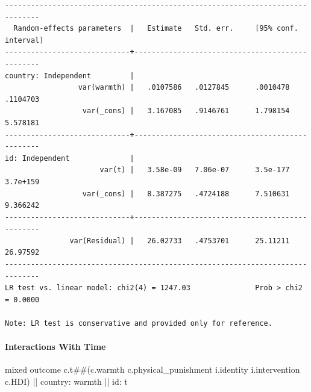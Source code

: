 \documentclass[
  letterpaper,
  DIV=11,
  numbers=noendperiod]{scrreprt}
\let\oldparagraph\paragraph
\renewcommand{\paragraph}[1]{\oldparagraph{#1}\mbox{}}
\newenvironment{Shaded}{\begin{snugshade}}{\end{snugshade}}
\newcommand{\KeywordTok}[1]{\textcolor[rgb]{0.00,0.23,0.31}{#1}}
\newcommand{\NormalTok}[1]{\textcolor[rgb]{0.00,0.23,0.31}{#1}}
\begin{document}
\begin{verbatim}
------------------------------------------------------------------------------
  Random-effects parameters  |   Estimate   Std. err.     [95% conf. interval]
-----------------------------+------------------------------------------------
country: Independent         |
                 var(warmth) |   .0107586   .0127845      .0010478    .1104703
                  var(_cons) |   3.167085   .9146761      1.798154    5.578181
-----------------------------+------------------------------------------------
id: Independent              |
                      var(t) |   3.58e-09   7.06e-07      3.5e-177    3.7e+159
                  var(_cons) |   8.387275   .4724188      7.510631    9.366242
-----------------------------+------------------------------------------------
               var(Residual) |   26.02733   .4753701      25.11211    26.97592
------------------------------------------------------------------------------
LR test vs. linear model: chi2(4) = 1247.03               Prob > chi2 = 0.0000

Note: LR test is conservative and provided only for reference.
\end{verbatim}

\paragraph{Interactions With Time}\label{interactions-with-time}

\begin{Shaded}
\begin{Highlighting}[]
\NormalTok{mixed outcome c.t\#\#(c.warmth c.physical\_punishment i.}\KeywordTok{identity}\NormalTok{ i.intervention c.HDI) || country: warmth || id: t}
\end{Highlighting}
\end{Shaded}
\end{document}
